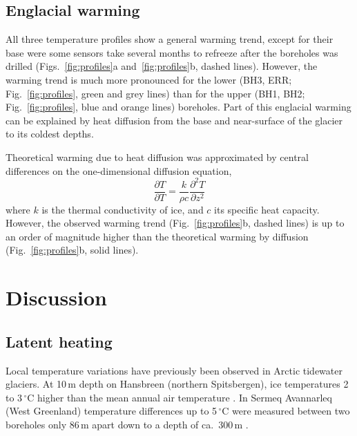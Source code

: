 \documentclass[utf8]{article}
\begin{document}
\subsection{Englacial warming}

    All three temperature profiles show a general warming trend, except for
    their base were some sensors take several months to refreeze after the
    boreholes was drilled (Figs.~\ref{fig:profiles}a and~\ref{fig:profiles}b,
    dashed lines). However, the warming trend is much more pronounced for the
    lower (BH3, ERR; Fig.~\ref{fig:profiles}, green and grey lines) than for
    the upper (BH1, BH2; Fig.~\ref{fig:profiles}, blue and orange lines)
    boreholes. Part of this
    englacial warming can be explained by heat diffusion from the base and
    near-surface of the glacier to its coldest depths.

    Theoretical warming due to heat diffusion was approximated by central
    differences on the one-dimensional diffusion equation,
    \begin{equation}
      \frac{\partial T}{\partial T} =
        \frac{k}{\rho c} \frac{\partial^2 T}{\partial z^2}
    \end{equation}
    where $k$ is the thermal conductivity of ice, and $c$ its specific heat
    capacity. However, the observed warming trend (Fig.~\ref{fig:profiles}b,
    dashed lines) is up to an order of magnitude higher than the theoretical
    warming by diffusion (Fig.~\ref{fig:profiles}b, solid lines).


\section{Discussion}

\subsection{Latent heating}

    Local temperature variations have previously been observed in Arctic
    tidewater glaciers. At 10\,m depth on Hansbreen (northern Spitsbergen),
    ice temperatures 2 to 3\,$^\circ$C higher than the mean annual air
    temperature \citep{Jania.etal.1996}. In Sermeq Avannarleq (West Greenland)
    temperature differences up to 5\,$^\circ$C were measured between two
    boreholes only 86\,m apart down to a depth of ca.~300\,m
    \citep{Luthi.etal.2015}.
\end{document}
